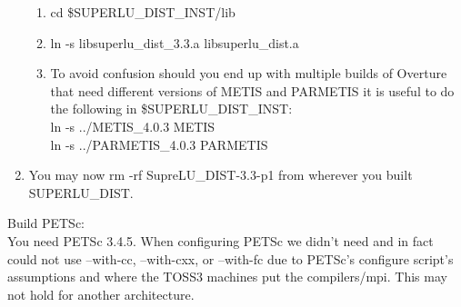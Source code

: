 \documentclass[11pt]{amsart}
\begin{document}
\begin{enumerate}
\begin{enumerate}
\item cd \$SUPERLU\_DIST\_INST/lib
\item ln -s libsuperlu\_dist\_3.3.a libsuperlu\_dist.a
\item To avoid confusion should you end up with multiple builds of Overture
that need different versions of METIS and PARMETIS it is useful to do the
following in \$SUPERLU\_DIST\_INST: \\
ln -s ../METIS\_4.0.3 METIS \\
ln -s ../PARMETIS\_4.0.3 PARMETIS
\end{enumerate}
\item You may now rm -rf SupreLU\_DIST-3.3-p1 from wherever you built \\
SUPERLU\_DIST.
\end{enumerate}

Build PETSc: \\
You need PETSc 3.4.5.  When configuring PETSc we didn't need and in fact could
not use --with-cc, --with-cxx, or --with-fc due to PETSc's configure script's
assumptions and where the TOSS3 machines put the compilers/mpi.  This may not
hold for another architecture.
\end{document}
